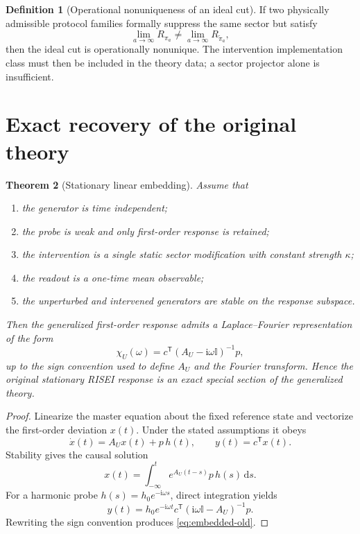 \documentclass[11pt]{article}
\newtheorem{theorem}{Theorem}[section]
\theoremstyle{definition}
\newtheorem{definition}[theorem]{Definition}
\theoremstyle{remark}
\newcommand{\dd}{\,\mathrm d}
\newcommand{\ii}{\mathrm i}
\newcommand{\id}{\mathbb I}
\begin{document}
\begin{definition}[Operational nonuniqueness of an ideal cut]\label{def:nonunique-cut}
If two physically admissible protocol families formally suppress the same sector but satisfy
\begin{equation}
\lim_{a\to\infty}R_{\pi_a}
\neq
\lim_{a\to\infty}R_{\widetilde\pi_a},
\label{eq:cut-nonunique}
\end{equation}
then the ideal cut is operationally nonunique. The intervention implementation class must then be included in the theory data; a sector projector alone is insufficient.
\end{definition}

\section{Exact recovery of the original theory}

\begin{theorem}[Stationary linear embedding]\label{thm:embedding}
Assume that
\begin{enumerate}
  \item the generator is time independent;
  \item the probe is weak and only first-order response is retained;
  \item the intervention is a single static sector modification with constant strength $\kappa$;
  \item the readout is a one-time mean observable;
  \item the unperturbed and intervened generators are stable on the response subspace.
\end{enumerate}
Then the generalized first-order response admits a Laplace--Fourier representation of the form
\begin{equation}
\chi_U(\omega)
 = c^{\mathsf T}(A_U-\ii\omega\id)^{-1}p,
\label{eq:embedded-old}
\end{equation}
up to the sign convention used to define $A_U$ and the Fourier transform. Hence the original stationary RISEI response is an exact special section of the generalized theory.
\end{theorem}

\begin{proof}
Linearize the master equation about the fixed reference state and vectorize the first-order deviation $x(t)$. Under the stated assumptions it obeys
\begin{equation}
\dot x(t)=A_Ux(t)+p\,h(t),
\qquad y(t)=c^{\mathsf T}x(t).
\end{equation}
Stability gives the causal solution
\begin{equation}
x(t)=\int_{-\infty}^{t}e^{A_U(t-s)}p\,h(s)\dd s.
\end{equation}
For a harmonic probe $h(s)=h_0e^{-\ii\omega s}$, direct integration yields
\begin{equation}
y(t)=h_0e^{-\ii\omega t}
 c^{\mathsf T}(\ii\omega\id-A_U)^{-1}p.
\end{equation}
Rewriting the sign convention produces \eqref{eq:embedded-old}.
\end{proof}
\end{document}

